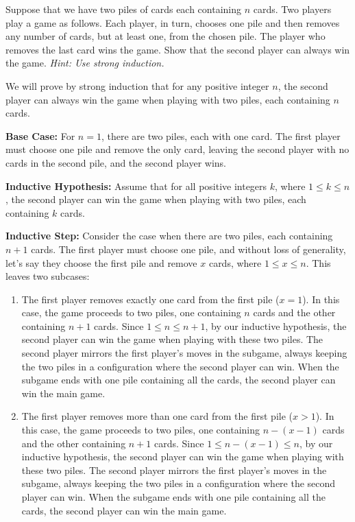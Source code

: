 \documentclass{article}
\theoremstyle{definition}
\begin{document}
\begin{question}
    Suppose that we have two piles of cards each containing $n$ cards. Two players play a game as follows. Each player, in turn, chooses one pile and then removes any number of cards, but at least one, from the chosen pile. The player who removes the last card wins the game. Show that the second player can always win the game. 
    \textit{Hint: Use strong induction.}
\end{question}
\begin{solution}
We will prove by strong induction that for any positive integer $n$, the second player can always win the game when playing with two piles, each containing $n$ cards.

\textbf{Base Case:} For $n = 1$, there are two piles, each with one card. The first player must choose one pile and remove the only card, leaving the second player with no cards in the second pile, and the second player wins.

\textbf{Inductive Hypothesis:} Assume that for all positive integers $k$, where $1 \leq k \leq n$, the second player can win the game when playing with two piles, each containing $k$ cards.

\textbf{Inductive Step:} Consider the case when there are two piles, each containing $n + 1$ cards. The first player must choose one pile, and without loss of generality, let's say they choose the first pile and remove $x$ cards, where $1 \leq x \leq n$. This leaves two subcases:

\begin{enumerate}
\item The first player removes exactly one card from the first pile ($x = 1$). In this case, the game proceeds to two piles, one containing $n$ cards and the other containing $n + 1$ cards. Since $1 \leq n \leq n + 1$, by our inductive hypothesis, the second player can win the game when playing with these two piles. The second player mirrors the first player's moves in the subgame, always keeping the two piles in a configuration where the second player can win. When the subgame ends with one pile containing all the cards, the second player can win the main game.

\item The first player removes more than one card from the first pile ($x > 1$). In this case, the game proceeds to two piles, one containing $n - (x - 1)$ cards and the other containing $n + 1$ cards. Since $1 \leq n - (x - 1) \leq n$, by our inductive hypothesis, the second player can win the game when playing with these two piles. The second player mirrors the first player's moves in the subgame, always keeping the two piles in a configuration where the second player can win. When the subgame ends with one pile containing all the cards, the second player can win the main game.


\end{enumerate}
\end{solution}
\end{document}
